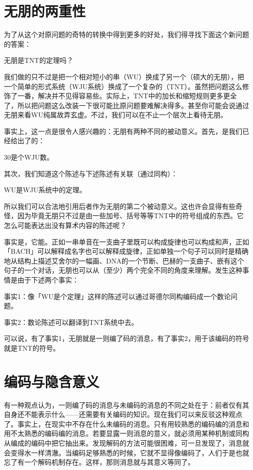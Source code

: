 \documentclass[
  12pt,
  twoside,
  openright,
  oldfontcommands,
]{memoir}
\begin{document}
\section{无朋的两重性}

为了从这个对原问题的奇特的转换中得到更多的好处，我们得寻找下面这个新问题的答案：

无朋是TNT的定理吗？

我们做的只不过是把一个相对短小的串（WU）换成了另一个（硕大的无朋），把一个简单的形式系统（WJU系统）换成了一个复杂的（TNT）。虽然把问题这么修饰了一番，解决并不见得容易些。实际上，TNT中的加长和缩短规则更多更全了，所以把问题这么改装一下很可能比原问题要难解决得多。甚至你可能会说通过无朋来看WU纯属故弄玄虚。不过，我们可以在不止一个层次上看待无朋。

事实上，这一点是很令人感兴趣的：无朋有两种不同的被动意义。首先，是我们已经给出了的：

30是个WJU数。

其次，我们知道这个陈述与下述陈述有关联（通过同构）：

WU是WJU系统中的定理。

所以我们可以合法地引用后者作为无朋的第二个被动意义。这也许会显得有些奇怪，因为毕竟无朋只不过是由一些加号、括号等等TNT中的符号组成的东西。它怎么可能表达出没有算术内容的陈述呢？

事实是，它能。正如一串单音在一支曲子里既可以构成旋律也可以构成和声，正如「BACH」可以解释成名字也可以解释成旋律，正如单独一个句子可以同时是精确地从结构上描述艾舍尔的一幅画、DNA的一个节断、巴赫的一支曲子、嵌有这个句子的一个对话，无朋也可以从（至少）两个完全不同的角度来理解。发生这种事情是由于下述两个事实：

事实1：像「WU是个定理」这样的陈述可以通过哥德尔同构编码成一个数论问题。

事实2：数论陈述可以翻译到TNT系统中去。

可以说，有了事实1，无朋就是一则编了码的消息，有了事实2，用于该编码的符号就是TNT的符号。

\section{编码与隐含意义}

有一种观点认为，一则编了码的消息与未编码的消息的不同之处在于：前者仅有其自身还不能表示什么------还需要有关编码的知识。现在我们可以来反驳这种观点了。事实上，在现实中不存在什么未编码的消息。只有用较熟悉的编码编的消息和用不太熟悉的编码编的消息。若要显露一则消息的意义，就必须用某种机制或同构从编成的编码中把它抽出来。发现解码的方法可能很困难，可一旦发现了，消息就会变得水一样清澈。当编码足够熟悉的时候，它就不显得像编码了，人们于是也就忘了有一个解码机制存在。这样，那则消息就与其意义等同了。
\end{document}
